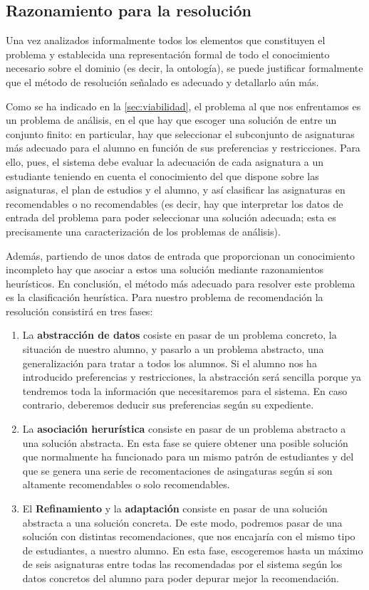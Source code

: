 
\subsection{Razonamiento para la resolución} \label{sec:razonamiento}

Una vez analizados informalmente todos los elementos que constituyen el 
problema y establecida una representación formal de todo el conocimiento 
necesario sobre el dominio (es decir, la ontología), se puede justificar 
formalmente que el método de resolución señalado es adecuado y detallarlo 
aún más.

Como se ha indicado en la \autoref{sec:viabilidad}, el problema al que nos 
enfrentamos es un problema de análisis, en el que hay que escoger una solución
de entre un conjunto finito: en particular, hay que seleccionar el subconjunto 
de asignaturas más adecuado para el alumno en función de sus preferencias y 
restricciones. Para ello, pues, el sistema debe evaluar la adecuación de 
cada asignatura a un estudiante teniendo en cuenta el conocimiento del que 
dispone sobre las asignaturas, el plan de estudios y el alumno, y así 
clasificar las asignaturas en recomendables o no recomendables (es decir, hay 
que interpretar los datos de entrada del problema para poder seleccionar una 
solución adecuada; esta es precisamente una caracterización de los problemas 
de análisis).

Además, partiendo de unos datos de entrada que proporcionan un conocimiento 
incompleto hay que asociar a estos una solución mediante razonamientos 
heurísticos. En conclusión, el método más adecuado para resolver este problema 
es la clasificación heurística. Para nuestro problema de recomendación la resolución consistirá en tres fases:

\begin{enumerate}
\item La \textbf{abstracción de datos} cosiste en pasar de un problema concreto, la situación de nuestro alumno, y pasarlo a un problema abstracto, una generalización para tratar a todos los alumnos. Si el alumno nos ha introducido preferencias y restricciones, la abstracción será sencilla porque ya tendremos toda la información que necesitaremos para el sistema. En caso contrario, deberemos deducir sus preferencias según su expediente.
\item La \textbf{asociación herurística} consiste en pasar de un problema abstracto a una solución abstracta. En esta fase se quiere obtener una posible solución que normalmente ha funcionado para un mismo patrón de estudiantes y del que se genera una serie de recomentaciones de asingaturas según si son altamente recomendables o solo recomendables.
\item El \textbf{Refinamiento} y la \textbf{adaptación} consiste en pasar de una solución abstracta a una solución concreta. De este modo, podremos pasar de una solución con distintas recomendaciones, que nos encajaría con el mismo tipo de estudiantes, a nuestro alumno. En esta fase, escogeremos hasta un máximo de seis asignaturas entre todas las recomendadas por el sistema según los datos concretos del alumno para poder depurar mejor la recomendación.
\end{enumerate}
